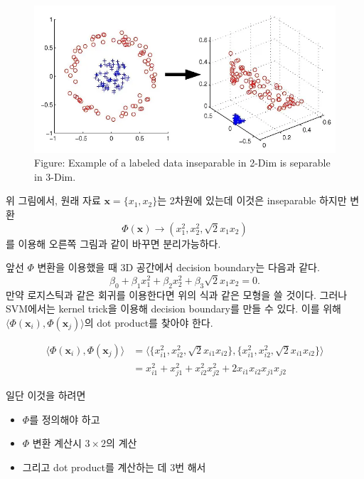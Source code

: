 \documentclass[
  letterpaper,
  DIV=11,
  numbers=noendperiod]{scrreprt}
\providecommand{\tightlist}{%
  \setlength{\itemsep}{0pt}\setlength{\parskip}{0pt}}\usepackage{longtable,booktabs,array}
\theoremstyle{definition}
\theoremstyle{plain}
\theoremstyle{definition}
\theoremstyle{definition}
\theoremstyle{remark}
\begin{document}
\begin{figure}[H]

{\centering \includegraphics[width=1\textwidth,height=\textheight]{images/kernel_ktrick01.png}

}

\caption{Figure: Example of a labeled data inseparable in 2-Dim is
separable in 3-Dim.}

\end{figure}%

위 그림에서, 원래 자료 \(\pmb{x} = \{x_1, x_2\}\)는 2차원에 있는데
이것은 inseparable 하지만 변환 \[
\Phi (\pmb{x}) \rightarrow (x_1^2, x_2^2, \sqrt{2}x_1x_2)
\] 를 이용해 오른쪽 그림과 같이 바꾸면 분리가능하다.

앞선 \(\Phi\) 변환을 이용했을 때 3D 공간에서 decision boundary는 다음과
같다. \[
\beta_0 + \beta_1 x_1^2 + \beta_2 x_2^2 + \beta_3 \sqrt{2} x_1 x_2 = 0.
\] 만약 로지스틱과 같은 회귀를 이용한다면 위의 식과 같은 모형을 쓸
것이다. 그러나 SVM에서는 kernel trick을 이용해 decision boundary를 만들
수 있다. 이를 위해
\(\langle \Phi(\pmb{x}_i), \Phi(\pmb{x}_j) \rangle\)의 dot product를
찾아야 한다.

\begin{align*}
\langle \Phi(\pmb{x}_i), \Phi(\pmb{x}_j) \rangle &= \langle \{x_{i1}^2, x_{i2}^2, \sqrt{2}x_{i1}x_{i2}\}, \{x_{i1}^2, x_{i2}^2, \sqrt{2}x_{i1}x_{i2}\} \rangle\\
&= x_{i1}^2 + x_{j1}^2 + x_{i2}^2 x_{j2}^2 + 2x_{i1}x_{i2}x_{j1}x_{j2}
\end{align*}

일단 이것을 하려면

\begin{itemize}
\tightlist
\item
  \(\Phi\)를 정의해야 하고
\item
  \(\Phi\) 변환 계산시 \(3\times 2\)의 계산
\item
  그리고 dot product를 계산하는 데 3번 해서
\end{itemize}
\end{document}
